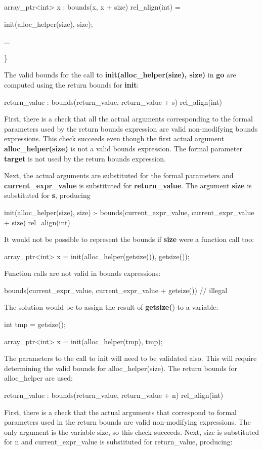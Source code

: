 \documentclass[]{article}
\begin{document}
array\_ptr\textless{}int\textgreater{} x : bounds(x, x + size)
rel\_align(int) =

init(alloc\_helper(size), size);

...

\}

The valid bounds for the call to \textbf{init(alloc\_helper(size),
size)} in \textbf{go} are computed using the return bounds for
\textbf{init}:

return\_value : bounds(return\_value, return\_value + s) rel\_align(int)

First, there is a check that all the actual arguments corresponding to
the formal parameters used by the return bounds expression are valid
non-modifying bounds expressions. This check succeeds even though the
first actual argument \textbf{alloc\_helper(size)} is not a valid bounds
expression. The formal parameter \textbf{target} is not used by the
return bounds expression.

Next, the actual arguments are substituted for the formal parameters and
\textbf{current\_expr\_value} is substituted for \textbf{return\_value}.
The argument \textbf{size} is substituted for \textbf{s}, producing

init(alloc\_helper(size), size) :- bounds(current\_expr\_value,
current\_expr\_value + size) rel\_align(int)

It would not be possible to represent the bounds if \textbf{size} were a
function call too:

array\_ptr\textless{}int\textgreater{} x =
init(alloc\_helper(getsize()), getsize());

Function calls are not valid in bounds expressions:

bounds(current\_expr\_value, current\_expr\_value + getsize()) //
illegal

The solution would be to assign the result of \textbf{getsize(}) to a
variable:

int tmp = getsize();

array\_ptr\textless{}int\textgreater{} x = init(alloc\_helper(tmp),
tmp);

The parameters to the call to init will need to be validated also. This
will require determining the valid bounds for alloc\_helper(size). The
return bounds for alloc\_helper are used:

return\_value : bounds(return\_value, return\_value + n) rel\_align(int)

First, there is a check that the actual arguments that correspond to
formal parameters used in the return bounds are valid non-modifying
expressions. The only argument is the variable size, so this check
succeeds. Next, size is substituted for n and current\_expr\_value is
substituted for return\_value, producing:
\end{document}
